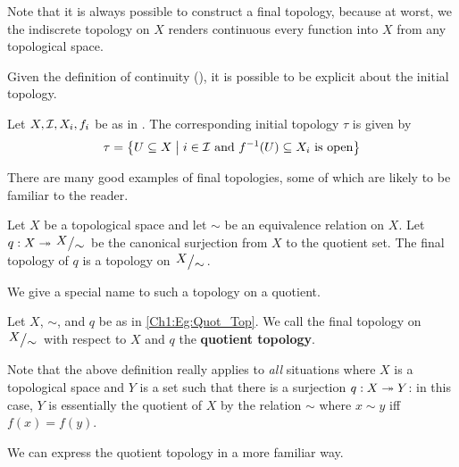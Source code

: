Note that it is always possible to construct a final topology, because at worst, we the indiscrete topology on $X$ renders continuous every function into $X$ from any topological space.

Given the definition of continuity (), it is possible to be explicit about the initial topology.

\begin{boxlemma}
    Let $X, \mathcal{I}, X_i, f_i$ be as in . The corresponding initial topology $\tau$ is given by
    \begin{align*}
        \tau = \left\{ U \subseteq X \; \middle\vert \; i \in \mathcal{I} \text{ and } f^{-1}(U) \subseteq X_i \text{ is open} \right\}
    \end{align*}
\end{boxlemma}

There are many good examples of final topologies, some of which are likely to be familiar to the reader.

\begin{boxexample}\label{Ch1:Eg:Quot_Top}
    Let $X$ be a topological space and let $\sim$ be an equivalence relation on $X$. Let $q : X \surj \quotient{X}{\sim}$ be the canonical surjection from $X$ to the quotient set. The final topology of $q$ is a topology on $\quotient{X}{\sim}$.
\end{boxexample}

We give a special name to such a topology on a quotient.

\begin{boxdefinition}
    Let $X$, $\sim$, and $q$ be as in \eqref{Ch1:Eg:Quot_Top}. We call the final topology on $\quotient{X}{\sim}$ with respect to $X$ and $q$ the \textbf{quotient topology}.
\end{boxdefinition}

Note that the above definition really applies to \textit{all} situations where $X$ is a topological space and $Y$ is a set such that there is a surjection $q : X \twoheadrightarrow Y$: in this case, $Y$ is essentially the quotient of $X$ by the relation $\sim$ where $x \sim y$ iff $f(x) = f(y)$.

We can express the quotient topology in a more familiar way.

\begin{boxproposition}
    \sorry %
\end{boxproposition}

